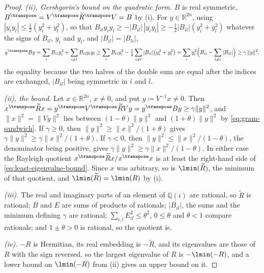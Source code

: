 \begin{proof}
\emph{(ii), Gershgorin's bound on the quadratic form.} $B$ is real symmetric,
$B^{\transpose}=V^{\transpose}\widetilde R^{\transpose}V=B$ by (i). For
$y\in\mathbb{R}^{2n}$, using $|y_iy_l|\le\tfrac12(y_i^{2}+y_l^{2})$, so that
$B_{il}y_iy_l\ge-|B_{il}|\,|y_iy_l|\ge-\tfrac12|B_{il}|(y_i^{2}+y_l^{2})$
whatever the signs of $B_{il}$, $y_i$ and $y_l$, and
$|B_{il}|=|B_{li}|$,
\begin{equation*}
  y^{\transpose}By=\sum_iB_{ii}y_i^{2}+\sum_{i\ne l}B_{il}y_iy_l
  \ge\sum_iB_{ii}y_i^{2}-\tfrac12\sum_{i\ne l}|B_{il}|\big(y_i^{2}+y_l^{2}\big)
  =\sum_iy_i^{2}\Big(B_{ii}-\sum_{l\ne i}|B_{il}|\Big)
  \ge\gamma\,\|y\|^{2},
\end{equation*}
the equality because the two halves of the double sum are equal after the
indices are exchanged, $|B_{il}|$ being symmetric in $i$ and $l$.

\emph{(ii), the bound.} Let $x\in\mathbb{R}^{2n}$, $x\ne0$, and put
$y\coloneqq V^{-1}x\ne0$. Then
$x^{\transpose}\widetilde Rx=y^{\transpose}V^{\transpose}\widetilde RVy
=y^{\transpose}By\ge\gamma\|y\|^{2}$, and $\|x\|^{2}=\|Vy\|^{2}$ lies
between $(1-\theta)\|y\|^{2}$ and $(1+\theta)\|y\|^{2}$ by
\eqref{eq:gram-sandwich}. If $\gamma\ge0$, then
$\|y\|^{2}\ge\|x\|^{2}/(1+\theta)$ gives
$\gamma\|y\|^{2}\ge\gamma\|x\|^{2}/(1+\theta)$. If $\gamma<0$, then
$\|y\|^{2}\le\|x\|^{2}/(1-\theta)$, the denominator being positive, gives
$\gamma\|y\|^{2}\ge\gamma\|x\|^{2}/(1-\theta)$. In either case the Rayleigh
quotient $x^{\transpose}\widetilde Rx/x^{\transpose}x$ is at least the
right-hand side of \eqref{eq:least-eigenvalue-bound}. Since $x$ was
arbitrary, so is $\lmin(\widetilde R)$, the minimum of that quotient, and
$\lmin(\widetilde R)=\lmin(R)$ by (i).

\emph{(iii).} The real and imaginary parts of an element of
$\mathbb{Q}(i)$ are rational, so $\widetilde R$ is rational; $B$ and $E$
are sums of products of rationals; $|B_{il}|$, the sums and the minimum
defining $\gamma$ are rational; $\sum_{i,l}E_{il}^{2}\le\theta^{2}$,
$0\le\theta$ and $\theta<1$ compare rationals; and $1\pm\theta>0$ is
rational, so the quotient is.

\emph{(iv).} $-R$ is Hermitian, its real embedding is $-\widetilde R$, and
its eigenvalues are those of $R$ with the sign reversed, so the largest
eigenvalue of $R$ is $-\lmin(-R)$, and a lower bound on $\lmin(-R)$ from
(ii) gives an upper bound on it.
\end{proof}
